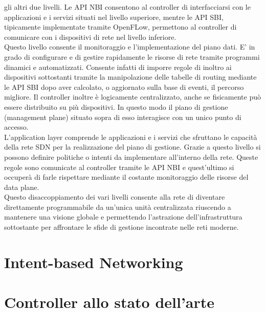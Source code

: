 gli altri due livelli. Le API NBI consentono al controller di interfacciarsi con le applicazioni e i servizi situati nel livello superiore,
mentre le API SBI, tipicamente implementate tramite OpenFLow, permettono al controller di comunicare con i dispositivi di rete nel livello inferiore.
\\Questo livello consente il monitoraggio e l'implementazione del piano
dati. E' in grado di configurare e di gestire rapidamente le risorse di rete tramite programmi dinamici e automatizzati. Consente infatti di imporre regole di
inoltro ai dispositivi sottostanti tramite la manipolazione delle tabelle di routing mediante le API SBI dopo aver calcolato, o aggiornato sulla base di eventi, il percorso migliore.
Il controller inoltre è logicamente centralizzato, anche se fisicamente può essere distribuito su più dispositivi. In questo modo il piano di gestione (management plane) situato sopra di esso interagisce con un
unico punto di accesso.
\\L'application layer comprende le applicazioni e i servizi che sfruttano le capacità della
rete SDN per la realizzazione del piano di gestione. Grazie a questo livello si possono
definire politiche o intenti da implementare all'interno della rete. Queste regole sono comunicate al
controller tramite le API NBI e quest'ultimo si occuperà di farle rispettare mediante il costante monitoraggio delle risorse del data plane. 
\\Questo disaccoppiamento dei vari livelli consente alla rete di diventare direttamente programmabile da un'unica unità
centralizzata riuscendo a mantenere una visione globale e permettendo l'astrazione dell'infrastruttura sottostante per affrontare le sfide 
di gestione incontrate nelle reti moderne.

\section{Intent-based Networking}

\section{Controller allo stato dell'arte}

